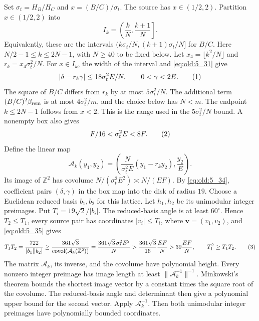 Set \(\sigma_t=H_B/H_C\) and \(x=(B/C)/\sigma_t\). The source has
\(x\in(1/2,2)\). Partition \(x\in(1/2,2)\) into
\[
 I_k=\left(\frac{k}{N},\frac{k+1}{N}\right].
\]
Equivalently, these are the intervals
\((k\sigma_t/N,(k+1)\sigma_t/N]\) for \(B/C\). Here
\(N/2-1\le k\le2N-1\), with \(N\ge40\) to be fixed below. Let
\(x_4=\lfloor k^2/N\rfloor\) and
\(r_k=x_4\sigma_t^2/N\). For \(x\in I_k\), the width of the interval
and \eqref{eq:old:5_31} give
\[
 |\delta-r_k\gamma|\le18\sigma_t^2E/N,\qquad 0<\gamma<2E.
\AutoTag{eq:old:5_34}
\]
The square of \(B/C\) differs from \(r_k\) by at most
\(5\sigma_t^2/N\). The additional term
\((B/C)^2\beta_{\rm rem}\) is at most \(4\sigma_t^2/m\), and the choice below has
\(N<m\). The endpoint \(k\le2N-1\) follows from \(x<2\). This is the
range used in the \(5\sigma_t^2/N\) bound. A nonempty box also gives
\[
 F/16<\sigma_t^2E<8F.
\AutoTag{eq:old:5_35}
\]
Define the linear map
\[
 \mathcal A_k(y_1,y_2)=
 \left(\frac{N}{\sigma_t^2E}(y_1-r_ky_2),\frac{y_2}{E}\right).
\]
Its image of \(\mathbb Z^2\) has covolume
\(N/(\sigma_t^2E^2)\asymp N/(EF)\). By \eqref{eq:old:5_34}, coefficient pairs
\((\delta,\gamma)\) in the box map into the disk of radius \(19\).
Choose a Euclidean reduced basis \(b_1,b_2\) for this lattice. Let
\(h_1,h_2\) be its unimodular integer preimages. Put
\(T_i=19\sqrt2/|b_i|\). The reduced-basis angle is at least \(60^\circ\).
Hence \(T_2\le T_1\), every source pair has coordinates
\(|v_i|\le T_i\), where \(\mathbf v=(v_1,v_2)\), and \eqref{eq:old:5_35} gives
\[
 T_1T_2
 =\frac{722}{|b_1||b_2|}
 \ge\frac{361\sqrt3}{\operatorname{covol}(\mathcal A_k(\mathbb Z^2))}
 =\frac{361\sqrt3\,\sigma_t^2E^2}{N}
 >\frac{361\sqrt3}{16}\frac{EF}{N}
 >39\frac{EF}{N},\qquad T_1^2\ge T_1T_2.
\AutoTag{eq:old:5_36}
\]
The matrix \(\mathcal A_k\), its inverse, and the covolume have polynomial
height. Every nonzero integer preimage has image length at least
\(\|\mathcal A_k^{-1}\|^{-1}\). Minkowski's theorem bounds the shortest
image vector by a constant times the square root of the covolume. The
reduced-basis angle and determinant then give a polynomial upper bound
for the second vector. Apply \(\mathcal A_k^{-1}\). Then both
unimodular integer preimages have polynomially bounded coordinates.

